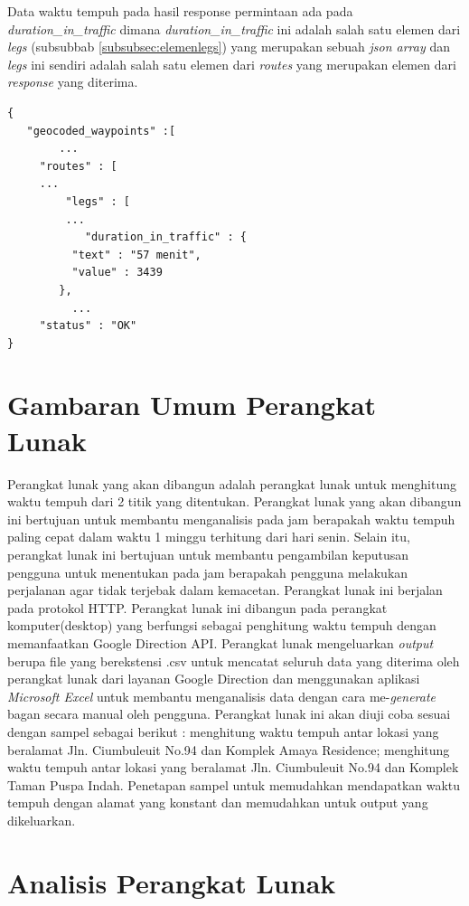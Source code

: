 Data waktu tempuh pada hasil response permintaan ada pada \textit{duration\_in\_traffic} dimana \textit{duration\_in\_traffic} ini adalah salah satu elemen dari \textit{legs} (subsubbab \ref{subsubsec:elemenlegs}) yang merupakan sebuah \textit{json array} dan \textit{legs} ini sendiri adalah salah satu elemen dari \textit{routes} yang merupakan elemen dari \textit{response} yang diterima.

\begin{lstlisting}[caption= Hasil \textit{response} Google Directions, captionpos=b]
{
   "geocoded_waypoints" :[
		...
	 "routes" : [
	 ...
		 "legs" : [
		 ...
			"duration_in_traffic" : {
          "text" : "57 menit",
          "value" : 3439
	    },
		  ...
	 "status" : "OK"
}
\end{lstlisting}


\section{Gambaran Umum Perangkat Lunak}
\label{sec:gambaranumum}

Perangkat lunak yang akan dibangun adalah perangkat lunak untuk menghitung waktu tempuh dari 2 titik yang ditentukan. Perangkat lunak yang akan dibangun ini bertujuan untuk membantu menganalisis pada jam berapakah waktu tempuh paling cepat dalam waktu 1 minggu terhitung dari hari senin. Selain itu, perangkat lunak ini bertujuan untuk membantu pengambilan keputusan pengguna untuk menentukan pada jam berapakah pengguna melakukan perjalanan agar tidak terjebak dalam kemacetan. Perangkat lunak ini berjalan pada protokol HTTP. Perangkat lunak ini dibangun pada perangkat komputer(desktop) yang berfungsi sebagai penghitung waktu tempuh dengan memanfaatkan Google Direction API. Perangkat lunak mengeluarkan \textit{output} berupa file yang berekstensi .csv untuk mencatat seluruh data yang diterima oleh perangkat lunak dari layanan Google Direction dan menggunakan aplikasi \textit{Microsoft Excel} untuk membantu menganalisis data dengan cara me-\textit{generate} bagan secara manual oleh pengguna.
Perangkat lunak ini akan diuji coba sesuai dengan sampel sebagai berikut : menghitung  waktu tempuh antar lokasi yang beralamat Jln. Ciumbuleuit No.94 dan Komplek Amaya Residence; menghitung  waktu tempuh antar lokasi yang beralamat Jln. Ciumbuleuit No.94 dan Komplek Taman Puspa Indah. Penetapan sampel untuk memudahkan mendapatkan waktu tempuh dengan alamat yang konstant dan memudahkan untuk output yang dikeluarkan.
						
\section{Analisis Perangkat Lunak}
\label{sec:analisispl}

